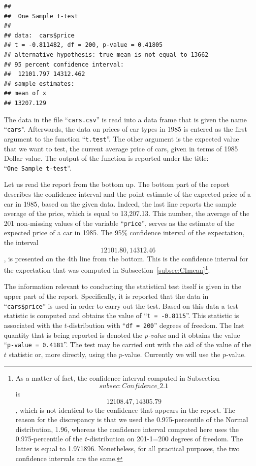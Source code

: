 \documentclass[]{krantz}
\theoremstyle{definition}
\theoremstyle{definition}
\theoremstyle{definition}
\theoremstyle{remark}
\begin{document}
\begin{verbatim}
## 
##  One Sample t-test
## 
## data:  cars$price
## t = -0.811482, df = 200, p-value = 0.41805
## alternative hypothesis: true mean is not equal to 13662
## 95 percent confidence interval:
##  12101.797 14312.462
## sample estimates:
## mean of x 
## 13207.129
\end{verbatim}

The data in the file ``\texttt{cars.csv}'' is read into a data frame that is
given the name ``\texttt{cars}''. Afterwards, the data on prices of car types in
1985 is entered as the first argument to the function ``\texttt{t.test}''. The
other argument is the expected value that we want to test, the current
average price of cars, given in terms of 1985 Dollar value. The output
of the function is reported under the title: ``\texttt{One\ Sample\ t-test}''.

Let us read the report from the bottom up. The bottom part of the report
describes the confidence interval and the point estimate of the expected
price of a car in 1985, based on the given data. Indeed, the last line
reports the sample average of the price, which is equal to 13,207.13.
This number, the average of the 201 non-missing values of the variable
``\texttt{price}'', serves as the estimate of the expected price of a car in
1985. The 95\% confidence interval of the expectation, the interval
\[12101.80, 14312.46\], is presented on the 4th line from the bottom.
This is the confidence interval for the expectation that was computed in
Subsection~\ref{subsec:CImean}\footnote{As a matter of fact, the confidence interval computed in
  Subsection~\[subsec:Confidence\_2.1\] is \[12108.47, 14305.79\],
  which is not identical to the confidence that appears in the report.
  The reason for the discrepancy is that we used the 0.975-percentile
  of the Normal distribution, 1.96, whereas the confidence interval
  computed here uses the 0.975-percentile of the \(t\)-distribution on
  201-1=200 degrees of freedom. The latter is equal to 1.971896.
  Nonetheless, for all practical purposes, the two confidence
  intervals are the same.}.

The information relevant to conducting the statistical test itself is
given in the upper part of the report. Specifically, it is reported that
the data in ``\texttt{cars\$price}'' is used in order to carry out the test. Based
on this data a test statistic is computed and obtains the value of
``\texttt{t\ =\ -0.8115}''. This statistic is associated with the \(t\)-distribution
with ``\texttt{df\ =\ 200}'' degrees of freedom. The last quantity that is being
reported is denoted the \emph{\(p\)-value} and it obtains the value
``\texttt{p-value\ =\ 0.4181}''. The test may be carried out with the aid of the
value of the \(t\) statistic or, more directly, using the \(p\)-value.
Currently we will use the \(p\)-value.
\end{document}
